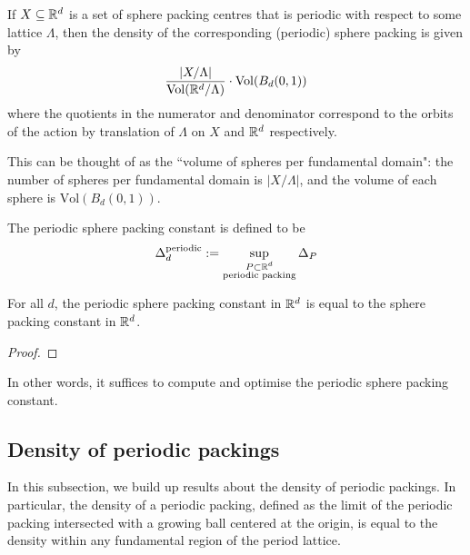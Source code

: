\begin{lemma}\label{SpherePacking.density of periodic packing}\notready
  If $X \subseteq \mathbb{R}^d$ is a set of sphere packing centres that is periodic with respect to some lattice $\Lambda$, then the density of the corresponding (periodic) sphere packing is given by
  $$ \frac{\lvert {X/\Lambda} \rvert}{\mathrm{Vol}(\mathbb{R}^d / \Lambda)} \cdot \mathrm{Vol}(B_d(0,1))$$
  where the quotients in the numerator and denominator correspond to the orbits of the action by translation of $\Lambda$ on $X$ and $\mathbb{R}^d$ respectively.
\end{lemma}
\begin{remark}
  This can be thought of as the ``volume of spheres per fundamental domain": the number of spheres per fundamental domain is $\lvert {X/\Lambda} \rvert$, and the volume of each sphere is $\mathrm{Vol}(B_d(0,1))$.
\end{remark}

\begin{definition}\label{def:Periodic-sphere-packing-constant}\notready
    The periodic sphere packing constant is defined to be
    $$ \Delta_{d}^{\text{periodic}} := \sup_{\substack{P \subset \mathbb{R}^d \\ \text{periodic packing}}} \Delta_P$$
\end{definition}

\begin{theorem}\label{periodic-packing-optimal}\notready
    For all $d$, the periodic sphere packing constant in $\mathbb{R}^d$ is equal to the sphere packing constant in $\mathbb{R}^d$.
\end{theorem}
\begin{proof}
\end{proof}

In other words, it suffices to compute and optimise the periodic sphere packing constant.

\subsection{Density of periodic packings}

In this subsection, we build up results about the density of periodic packings. In particular, the density of a periodic packing, defined as the limit of the periodic packing intersected with a growing ball centered at the origin, is equal to the density within any fundamental region of the period lattice.

